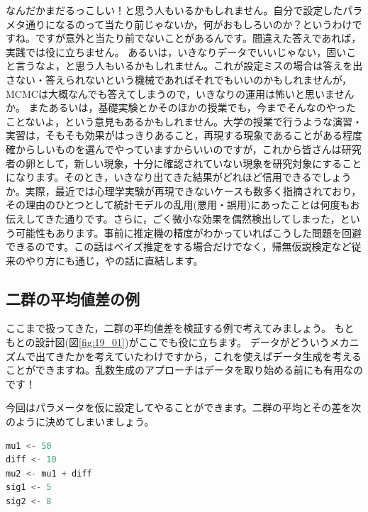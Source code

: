\documentclass{ltjsbook}
\begin{document}
なんだかまだるっこしい！と思う人もいるかもしれません。自分で設定したパラメタ通りになるのって当たり前じゃないか，何がおもしろいのか？というわけですね。ですが意外と当たり前でないことがあるんです。間違えた答えであれば，実践では役に立ちません。
あるいは，いきなりデータでいいじゃない，固いこと言うなよ，と思う人もいるかもしれません。これが設定ミスの場合は答えを出さない・答えられないという機械であればそれでもいいのかもしれませんが，MCMCは大概なんでも答えてしまうので，いきなりの運用は怖いと思いませんか。
またあるいは，基礎実験とかそのほかの授業でも，今までそんなのやったことないよ，という意見もあるかもしれません。大学の授業で行うような演習・実習は，そもそも効果がはっきりあること，再現する現象であることがある程度確からしいものを選んでやっていますからいいのですが，これから皆さんは研究者の卵として，新しい現象，十分に確認されていない現象を研究対象にすることになります。そのとき，いきなり出てきた結果がどれほど信用できるでしょうか。実際，最近では心理学実験が再現できないケースも数多く指摘されており，その理由のひとつとして統計モデルの乱用(悪用・誤用)にあったことは何度もお伝えしてきた通りです。さらに，ごく微小な効果を偶然検出してしまった，という可能性もあります。事前に推定機の精度がわかっていればこうした問題を回避できるのです。この話はベイズ推定をする場合だけでなく，帰無仮説検定など従来のやり方にも通じ，やの話に直結します。

\subsection{二群の平均値差の例}
ここまで扱ってきた，二群の平均値差を検証する例で考えてみましょう。
もともとの設計図(図\ref{fig:19_01})がここでも役に立ちます。
データがどういうメカニズムで出てきたかを考えていたわけですから，これを使えばデータ生成を考えることができますね。乱数生成のアプローチはデータを取り始める前にも有用なのです！

今回はパラメータを仮に設定してやることができます。二群の平均とその差を次のように決めてしまいましょう。
\begin{lstlisting}[language=c++,label={code:20_02},caption={平均値差の設定}]
mu1 <- 50
diff <- 10
mu2 <- mu1 + diff
sig1 <- 5
sig2 <- 8
\end{lstlisting}
\end{document}
